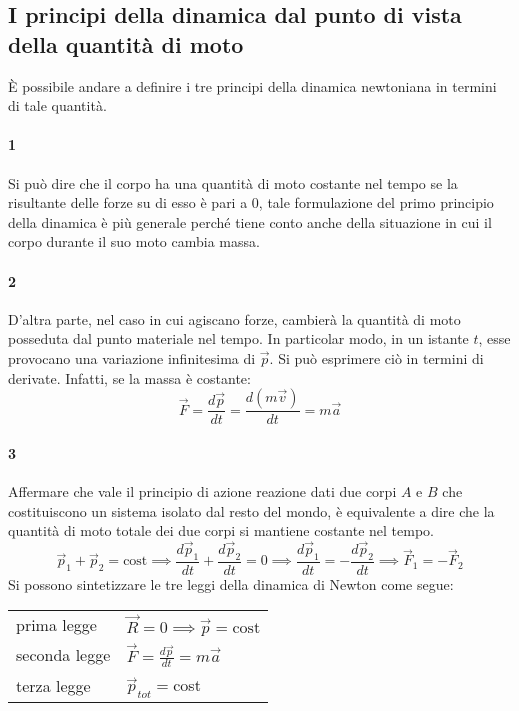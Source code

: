 \documentclass[10pt,a4paper]{book}
\begin{document}
\subsection{I principi della dinamica dal punto di vista della quantità di moto}
È possibile andare a definire i tre principi della dinamica newtoniana in termini di tale quantità.

\paragraph{1} Si può dire che il corpo ha una quantità di moto costante nel tempo se la risultante delle forze su di esso è pari a $0$, tale formulazione del primo principio della dinamica è più generale perché tiene conto anche della situazione in cui il corpo durante il suo moto cambia massa.

\paragraph{2} D'altra parte, nel caso in cui agiscano forze, cambierà la quantità di moto posseduta dal punto materiale nel tempo. In particolar modo, in un istante $t$, esse provocano una variazione infinitesima di $\vec{p}$. Si può esprimere ciò in termini di derivate. Infatti, se la massa è costante:
\[
	\vec{F}=\frac{d\vec{p}}{dt}=\frac{d(m\vec{v})}{dt}=m\vec{a}
\]

\paragraph{3} Affermare che vale il principio di azione reazione dati due corpi $A$ e $B$ che costituiscono un sistema isolato dal resto del mondo, è equivalente a dire che la quantità di moto totale dei due corpi si mantiene costante nel tempo.
\[
	\vec{p}_1+\vec{p}_2=\text{cost} \implies \frac{d\vec{p}_1}{dt}+\frac{d\vec{p}_2}{dt}=0 \implies \frac{d\vec{p}_1}{dt}=-\frac{d\vec{p}_2}{dt} \implies \vec{F}_1=-\vec{F}_2
\]
Si possono sintetizzare le tre leggi della dinamica di Newton come segue:
\begin{center}
	\begin{tabular}{ll}
		\toprule
		\midrule
		prima legge	  & $\vec{R}=0 \implies \vec{p} = \text{cost}$ \\
		seconda legge & $\vec{F}=\frac{d\vec{p}}{dt} = m\vec{a}$ \\
		terza legge   & $\vec{p}_{tot} = $cost \\
		\bottomrule
	\end{tabular}
\end{center}
\end{document}
